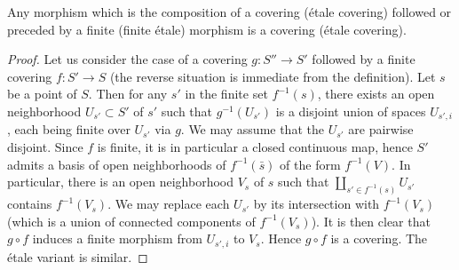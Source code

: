 \begin{lem}\label{lem::1.2.4}
 Any morphism which is the composition of a covering (\resp \'etale
 covering) followed or preceded by a finite (\resp finite \'etale)
 morphism is a covering (\resp \'etale covering).
\end{lem}
\begin{proof}
 Let us consider the case of a covering $g:S''\to S'$
 followed by a finite covering $f:S'\to S$ (the reverse situation is
 immediate from the definition). Let $s$ be a point of $S$. Then for any
 $s'$ in the finite set $f^{-1}(s)$, there exists an open neighborhood
 $U_{s'}\subset S'$ of $s'$ such that $g^{-1}(U_{s'})$ is a disjoint
 union of spaces $U_{s',i}$, each being finite over $U_{s'}$ via $g$. We
 may assume that the $U_{s'}$ are pairwise disjoint. Since $f$ is finite,
 it is in particular a closed continuous map, hence 
 $S'$ admits a basis of open neighborhoods of $f^{-1}(\bar{s})$ of
 the form $f^{-1}(V)$. 
 In particular,
 there is an open neighborhood $V_s$ of $s$ such that $\displaystyle
 \coprod_{s'\in f^{-1}(s)} U_{s'}$ contains $f^{-1}(V_s)$. We may
 replace each $U_{s'}$ by its intersection with $f^{-1}(V_s)$ (which is a
 union of connected components of $f^{-1}(V_s)$). It is then clear that
 $g\circ f$ induces a finite morphism from $U_{s',i}$ to $V_s$. Hence
 $g\circ f$ is a covering.  The \'etale variant is similar.
\end{proof}

